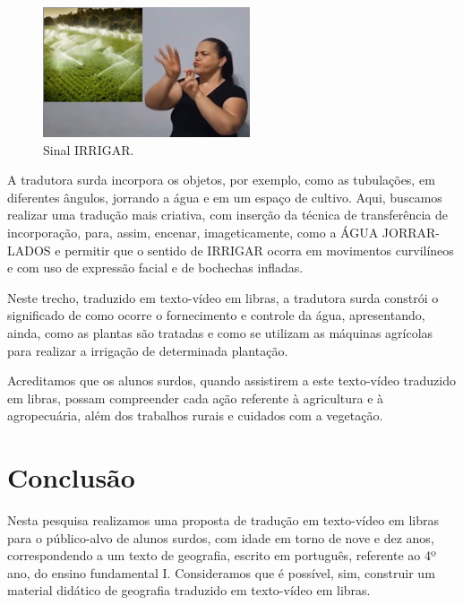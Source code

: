 \documentclass[portuguese]{textolivre}
\begin{document}
\begin{figure}[h!]
\centering
\begin{minipage}{0.5\textwidth}
    \includegraphics[width=\linewidth]{Fig13.png}
    \caption{Sinal IRRIGAR.}
    \label{fig13}
\end{minipage}
\end{figure}


A tradutora surda incorpora os objetos, por exemplo, como as tubulações, em diferentes ângulos, jorrando a água e em um espaço de cultivo. Aqui, buscamos realizar uma tradução mais criativa, com inserção da técnica de transferência de incorporação, para, assim, encenar, imageticamente, como a ÁGUA JORRAR-LADOS e permitir que o sentido de IRRIGAR ocorra em movimentos curvilíneos e com uso de expressão facial e de bochechas infladas. 

Neste trecho, traduzido em texto-vídeo em libras, a tradutora surda constrói o significado de como ocorre o fornecimento e controle da água, apresentando, ainda, como as plantas são tratadas e como se utilizam as máquinas agrícolas para realizar a irrigação de determinada plantação. 

Acreditamos que os alunos surdos, quando assistirem a este texto-vídeo traduzido em libras, possam compreender cada ação referente à agricultura e à agropecuária, além dos trabalhos rurais e cuidados com a vegetação. 

\section{Conclusão}\label{sec-resumo}
Nesta pesquisa realizamos uma proposta de tradução em texto-vídeo em libras para o público-alvo de alunos surdos, com idade em torno de nove e dez anos, correspondendo a um texto de geografia, escrito em português, referente ao 4º ano, do ensino fundamental I. Consideramos que é possível, sim, construir um material didático de geografia traduzido em texto-vídeo em libras. 
\end{document}
